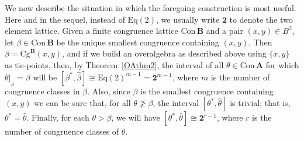 \documentclass[cm,dissertation]{uhthesis}
\theoremstyle{plain}
\theoremstyle{definition}
\theoremstyle{remark}
\numberwithin{theorem}{section}
\numberwithin{claim}{chapter}
\numberwithin{equation}{section}
\numberwithin{conjecture}{chapter}
\newcommand{\<}{\ensuremath{\langle}}
\renewcommand{\>}{\ensuremath{\rangle}}
\renewcommand{\ngeq}{\ensuremath{\ngeqslant}}
\newcommand{\Eq}{\ensuremath{\mathrm{Eq}}}
\newcommand{\Cg}{\ensuremath{\mathrm{Cg}}}
\newcommand{\Con}{\ensuremath{\mathrm{Con\,}}}
\newcommand{\0}{\ensuremath{\mathbf{0}}}
\newcommand{\1}{\ensuremath{\mathbf{1}}}
\newcommand{\2}{\ensuremath{\mathbf{2}}}
\newcommand{\3}{\ensuremath{\mathbf{3}}}
\newcommand{\4}{\ensuremath{\mathbf{4}}}
\newcommand{\5}{\ensuremath{\mathbf{5}}}
\newcommand{\bA}{\ensuremath{\mathbf{A}}}
\newcommand{\bB}{\ensuremath{\mathbf{B}}}
\newcommand{\resB}{\ensuremath{|_{_B}}}
\newcommand{\two}{\ensuremath{\mathbf{2}}}
\begin{document}
We now describe the situation in which the foregoing construction is most
useful.  Here and in the sequel, instead of $\Eq(2)$, we usually write
$\two$ to denote the two element lattice. 
Given a finite congruence lattice $\Con\bB$ and a pair $(x,y) \in B^2$,
let $\beta\in \Con\bB$ be the unique smallest congruence containing $(x,y)$.
Then $\beta = \Cg^\bB(x,y)$, and if we build an overalgebra as
described above using $\{x,y\}$ as tie-points, then, by
Theorem~\ref{OAthm2}, the interval of all
$\theta \in \Con\bA$ for which $\theta\resB = \beta$ will be 
$[\beta^*,\widehat{\beta}] \cong \Eq(2)^{m-1} = \two^{m-1}$, where $m$ is the
number of congruence classes in $\beta$.  Also, since $\beta$ is the smallest
congruence containing $(x,y)$ we can be sure that, for all $\theta \ngeq \beta$,
the interval $[\theta^*,\widehat{\theta}]$ is trivial; that is,
$\theta^*=\widehat{\theta}$. Finally, for each $\theta > \beta$, we will have 
$[\theta^*,\widehat{\theta}] \cong \two^{r-1}$, where $r$ is the number of
congruence classes of $\theta$.
\end{document}
